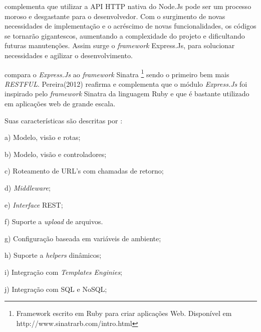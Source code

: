    complementa que utilizar a API HTTP nativa do Node.Js pode ser um processo moroso e desgastante
  para o desenvolvedor. 
  Com o surgimento de novas necessidades de implementação e o acréscimo de novas funcionalidades,
  os códigos se tornarão gigantescos, aumentando a complexidade do projeto e dificultando futuras manutenções. Assim surge o 
  \textit{framework} Express.Js, para solucionar necessidades e agilizar o desenvolvimento.
  
   compara o \textit{Express.Js} ao \textit{framework} Sinatra \footnote{Framework escrito em Ruby para criar aplicações Web. 
  Disponível em http://www.sinatrarb.com/intro.html} sendo o primeiro bem mais \textit{RESTFUL}. 
  Pereira(2012) reafirma e complementa que o módulo \textit{Express.Js} foi inspirado pelo \textit{framework} Sinatra da 
  linguagem Ruby e que é bastante utilizado em aplicações web de grande escala.
  
  Suas características são descritas por :
  
  \begin{compactitem}
    \item[a)] Modelo, visão e rotas;   
    
    \item[b)] Modelo, visão e controladores;
    
    \item[c)] Roteamento de URL's com chamadas de retorno;
    
    \item[d)] \textit{Middleware};
    
    \item[e)] \textit{Interface} REST;
    
    \item[f)] Suporte a \textit{upload} de arquivos.
    
    \item[g)] Configuração baseada em variáveis de ambiente;
    
    \item[h)] Suporte a \textit{helpers} dinâmicos;
    
    \item[i)] Integração com \textit{Templates Enginies};
    
    \item[j)] Integração com SQL e NoSQL;
    
  \end{compactitem}
  
